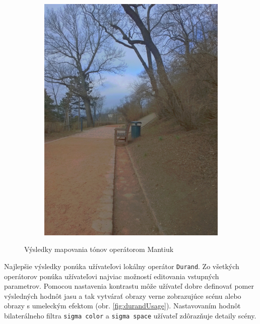 \begin{figure}[h!]
\begin{subfigure}{0.3\textwidth}
      \includegraphics[width=\textwidth]{figures/tests/tmo/man4}
  \end{subfigure}
  \caption{Výsledky mapovania tónov operátorom Mantiuk}
  \label{fig:mantiuks}
\end{figure}

Najlepšie výsledky ponúka užívateľovi lokálny operátor \texttt{Durand}. Zo všetkých operátorov ponúka užívateľovi
najviac možností editovania vstupných parametrov. Pomocou nastavenia kontrastu môže užívateľ dobre definovať pomer výsledných
hodnôt jasu a tak vytvárať obrazy verne zobrazujúce scénu alebo obrazy s umeleckým efektom (obr. \ref{fig:durandUsage}).
Nastavovaním hodnôt bilaterálneho filtra \texttt{sigma color} a \texttt{sigma space} užívateľ zdôrazňuje detaily scény.

